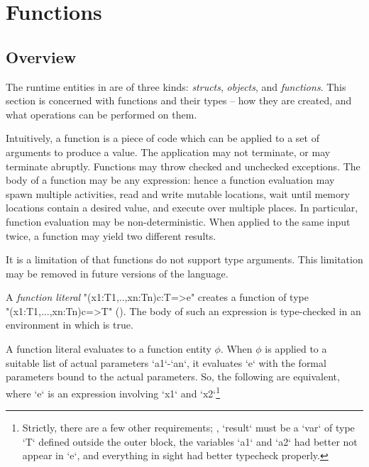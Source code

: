 \chapter{Functions}
\label{Functions}
\label{functions}
\label{Closures}

\section{Overview}
The runtime entities in \Xten{} are of three kinds: \emph{structs},
\emph{objects}, and \emph{functions}. This section is concerned with
functions and their types -- how they are created, and what operations
can be performed on them.

Intuitively, a function is a piece of code which can be applied to a
set of arguments to produce a value. The application may not
terminate, or may terminate abruptly. Functions may throw checked and
unchecked exceptions. The body of a function may be any \Xten{}
expression: hence a function evaluation may spawn multiple activities,
read and write mutable locations, wait until memory locations contain
a desired value, and execute over multiple places. In particular,
function evaluation may be non-deterministic. When applied to the same
input twice, a function may yield two different results.

It is a limitation of \XtenCurrVer{} that functions do not support
type arguments. This limitation may be removed in future versions of
the language.

A \emph{function literal} \xcd"(x1:T1,..,xn:Tn){c}:T=>e" creates a function of
type\\ \xcd"(x1:T1,...,xn:Tn){c}=>T" (). The body 
of such an expression is type-checked in an environment in which  is
true. 

A function literal evaluates to a function entity {$\phi$}. When {$\phi$} is
applied to a suitable list of actual parameters \xcd`a1`-\xcd`an`, it
evaluates \xcd`e` with the formal parameters bound to the actual parameters.
So, the following are equivalent, where \xcd`e` is an expression involving
\xcd`x1` and \xcd`x2`\footnote{Strictly, there are a few other requirements;
  \eg, \xcd`result` must be a \xcd`var` of type \xcd`T` defined outside the
  outer block, the variables \xcd`a1` and \xcd`a2` had better not appear in
  \xcd`e`, and everything in sight had better typecheck properly.}

